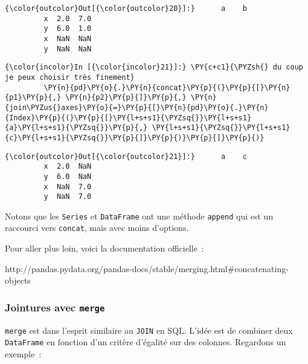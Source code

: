 \begin{Verbatim}[commandchars=\\\{\}]
{\color{outcolor}Out[{\color{outcolor}20}]:}      a    b
         x  2.0  7.0
         y  6.0  1.0
         x  NaN  NaN
         y  NaN  NaN
\end{Verbatim}
            
    \begin{Verbatim}[commandchars=\\\{\}]
{\color{incolor}In [{\color{incolor}21}]:} \PY{c+c1}{\PYZsh{} du coup je peux choisir très finement}
         \PY{n}{pd}\PY{o}{.}\PY{n}{concat}\PY{p}{(}\PY{p}{[}\PY{n}{p1}\PY{p}{,} \PY{n}{p2}\PY{p}{]}\PY{p}{,} \PY{n}{join\PYZus{}axes}\PY{o}{=}\PY{p}{[}\PY{n}{pd}\PY{o}{.}\PY{n}{Index}\PY{p}{(}\PY{p}{[}\PY{l+s+s1}{\PYZsq{}}\PY{l+s+s1}{a}\PY{l+s+s1}{\PYZsq{}}\PY{p}{,} \PY{l+s+s1}{\PYZsq{}}\PY{l+s+s1}{c}\PY{l+s+s1}{\PYZsq{}}\PY{p}{]}\PY{p}{)}\PY{p}{]}\PY{p}{)}
\end{Verbatim}


\begin{Verbatim}[commandchars=\\\{\}]
{\color{outcolor}Out[{\color{outcolor}21}]:}      a    c
         x  2.0  NaN
         y  6.0  NaN
         x  NaN  7.0
         y  NaN  7.0
\end{Verbatim}
            
    Notons que les \texttt{Series} et \texttt{DataFrame} ont une méthode
\texttt{append} qui est un raccourci vers \texttt{concat}, mais avec
moins d'options.

Pour aller plus loin, voici la documentation officielle~:

http://pandas.pydata.org/pandas-docs/stable/merging.html\#concatenating-objects

    \hypertarget{jointures-avec-merge}{%
\subsubsection{\texorpdfstring{Jointures avec
\texttt{merge}}{Jointures avec merge}}\label{jointures-avec-merge}}

    \texttt{merge} est dans l'esprit similaire au \texttt{JOIN} en SQL.
L'idée est de combiner deux \texttt{DataFrame} en fonction d'un critère
d'égalité sur des colonnes. Regardons un exemple~:

